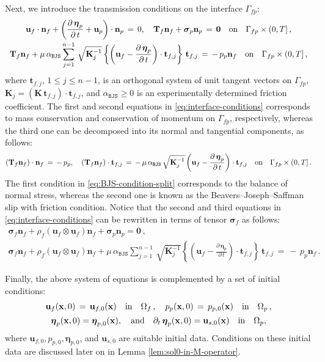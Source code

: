 \documentclass[11pt]{article}
\numberwithin{equation}{section}
\newcommand{\ds}{\displaystyle}
\newcommand{\bbeta}{{\boldsymbol\eta}}
\newcommand{\bsi}{{\boldsymbol\sigma}}
\newcommand{\bu}{\mathbf{u}}
\newcommand{\bt}{{\mathbf{t}}}
\newcommand{\bn}{{\mathbf{n}}}
\newcommand{\0}{{\mathbf{0}}}
\def\bK{\mathbf{K}}
\def\bT{\mathbf{T}}
\def\bx{\mathbf{x}}
\def\BJS{\mathtt{BJS}}
\def\qin{{\quad\hbox{in}\quad}}
\def\qon{{\quad\hbox{on}\quad}}
\def\qan{{\quad\hbox{and}\quad}}
\numberwithin{equation}{section}
\begin{document}
Next, we introduce the transmission conditions on the interface $\Gamma_{fp}$:
\begin{equation}\label{eq:interface-conditions}
\begin{array}{c}
\ds \bu_f\cdot\bn_f + \left(\frac{\partial\,\bbeta_p}{\partial\,t} + \bu_p\right)\cdot\bn_p \,=\, 0,\quad 
\bT_f\bn_f + \bsi_p\bn_p \,=\, \0 \qon \Gamma_{fp}\times (0,T] \,, \\[2ex]
\ds \bT_f\bn_f + \mu\,\alpha_{\BJS}\sum^{n-1}_{j=1}\,\sqrt{\bK^{-1}_j}\left\{\left(\bu_f - \frac{\partial\,\bbeta_p}{\partial\,t}\right)\cdot\bt_{f,j}\right\}\,\bt_{f,j} \,=\, -\,p_p\bn_f \qon \Gamma_{fp}\times (0,T] \,,
\end{array}	
\end{equation}
where $\bt_{f,j}$, $1\leq j\leq n-1$, is an orthogonal system of unit tangent vectors on $\Gamma_{fp}$, $\bK_j = (\bK\,\bt_{f,j})\cdot\bt_{f,j}$, and $\alpha_{\BJS} \geq 0$ is an experimentally determined friction coefficient.
The first and second equations in \eqref{eq:interface-conditions} corresponds to mass conservation and conservation of momentum on $\Gamma_{fp}$, respectively, whereas the third one can be decomposed into its normal and tangential components, as follows:
\begin{equation}\label{eq:BJS-condition-split}
(\bT_f\bn_f)\cdot\bn_f \,=\, -\,p_p,\quad
(\bT_f\bn_f)\cdot\bt_{f,j} \,=\, -\,\mu\,\alpha_{\BJS}\,\sqrt{\bK^{-1}_j}\left(\bu_f - \frac{\partial\,\bbeta_p}{\partial\,t}\right)\cdot\bt_{f,j} \qon \Gamma_{fp}\times (0,T]\,.
\end{equation}
The first condition in \eqref{eq:BJS-condition-split} corresponds to the balance of normal stress, whereas the second one is known as the Beavers--Joseph--Saffman slip with friction condition.
Notice that the second and third equations in \eqref{eq:interface-conditions} can be rewritten in terms of tensor $\bsi_f$ as follows:
\begin{equation}\label{eq:BJS-condition-2}
\begin{array}{c}
\ds \bsi_f\bn_f + \rho_f(\bu_f\otimes \bu_f)\bn_f + \bsi_p\bn_p = \0 \,, \\[2ex]
\ds \bsi_f\bn_f + \rho_f(\bu_f\otimes \bu_f)\bn_f
+ \mu\,\alpha_{\BJS}\sum^{n-1}_{j=1}\,\sqrt{\bK^{-1}_j}\left\{\left(\bu_f - \frac{\partial\,\bbeta_p}{\partial\,t}\right)\cdot\bt_{f,j}\right\}\,\bt_{f,j} \,=\, -\,p_p\bn_f\,.
\end{array}	
\end{equation}

 
Finally, the above system of equations is complemented by a set of initial conditions:
\begin{equation*}
\begin{array}{c}
\ds \bu_f(\bx,0) \,=\, \bu_{f,0}(\bx) \qin \Omega_f\,,\quad	
p_p(\bx,0) \,=\, p_{p,0}(\bx) \qin \Omega_p \,, \\[1ex]
\ds \bbeta_p(\bx,0) = \bbeta_{p,0}(\bx),\qan
\partial_t\,\bbeta_p(\bx,0) = \bu_{s,0}(\bx) \qin \Omega_p,
\end{array}
\end{equation*}
where $\bu_{f,0}, p_{p,0}, \bbeta_{p,0}$, and $\bu_{s,0}$ are suitable initial data.
Conditions on these initial data are discussed later on in Lemma \ref{lem:sol0-in-M-operator}.
\end{document}
